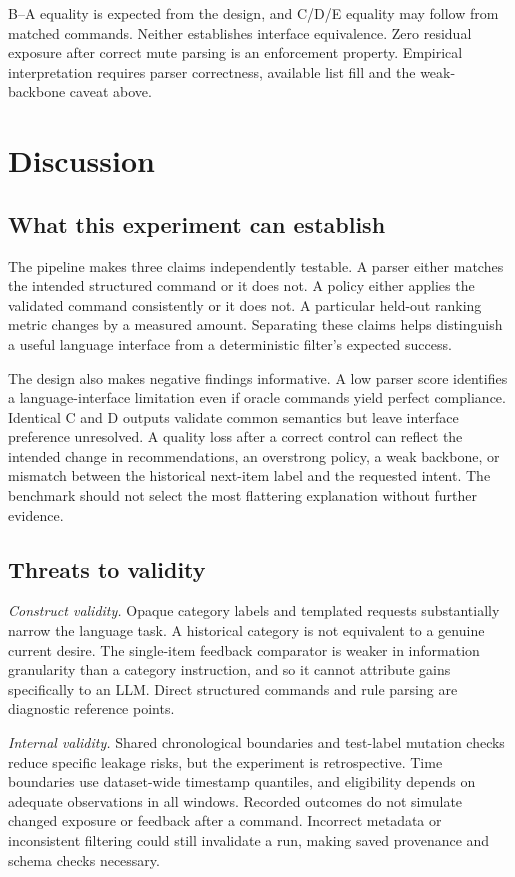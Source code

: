 \documentclass[conference]{IEEEtran}
\begin{document}
B--A equality is expected from the design, and C/D/E equality may follow from matched commands. Neither establishes interface equivalence. Zero residual exposure after correct mute parsing is an enforcement property. Empirical interpretation requires parser correctness, available list fill and the weak-backbone caveat above.

\section{Discussion}
\subsection{What this experiment can establish}
The pipeline makes three claims independently testable. A parser either matches the intended structured command or it does not. A policy either applies the validated command consistently or it does not. A particular held-out ranking metric changes by a measured amount. Separating these claims helps distinguish a useful language interface from a deterministic filter's expected success.

The design also makes negative findings informative. A low parser score identifies a language-interface limitation even if oracle commands yield perfect compliance. Identical C and D outputs validate common semantics but leave interface preference unresolved. A quality loss after a correct control can reflect the intended change in recommendations, an overstrong policy, a weak backbone, or mismatch between the historical next-item label and the requested intent. The benchmark should not select the most flattering explanation without further evidence.

\subsection{Threats to validity}
\textit{Construct validity.} Opaque category labels and templated requests substantially narrow the language task. A historical category is not equivalent to a genuine current desire. The single-item feedback comparator is weaker in information granularity than a category instruction, and so it cannot attribute gains specifically to an LLM. Direct structured commands and rule parsing are diagnostic reference points.

\textit{Internal validity.} Shared chronological boundaries and test-label mutation checks reduce specific leakage risks, but the experiment is retrospective. Time boundaries use dataset-wide timestamp quantiles, and eligibility depends on adequate observations in all windows. Recorded outcomes do not simulate changed exposure or feedback after a command. Incorrect metadata or inconsistent filtering could still invalidate a run, making saved provenance and schema checks necessary.
\end{document}

